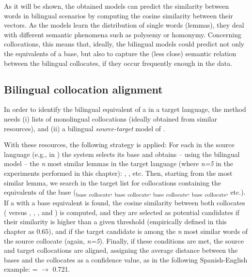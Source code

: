 \documentclass[output=paper,modfonts,nonflat]{langsci/langscibook}
\begin{document}
As it will be shown, the obtained models can predict the similarity between words
in bilingual scenarios by computing the cosine similarity between their vectors. As
the models learn the distribution of single words (lemmas), they deal with different
semantic phenomena such as polysemy or homonymy. Concerning collocations, this means
that, ideally, the bilingual models could predict not only the equivalents of a
base, but also to capture the (less close) semantic relation between the
bilingual collocates, if they occur frequently enough in the data.

%
\subsection{Bilingual collocation alignment}
\label{garcia:sec:align}
In order to identify the bilingual equivalent of a  in a target language,
the method needs (i) lists of monolingual collocations (ideally obtained from similar
resources), and (ii) a bilingual \emph{source-target} model of .

With these resources, the following strategy is applied: For each 
in the source language (e.g.,  in ) the system selects its base and obtains -- using the bilingual model --
the \emph{n} most similar lemmas in the target language (where \emph{n=5} in the experiments
performed in this chapter): , , etc. Then, starting from the most similar lemma,
we search in the target list for collocations containing the equivalents of
the base (\textsubscript{base} \textsubscript{collocate},
\textsubscript{base} \textsubscript{collocate}, \textsubscript{base} \textsubscript{collocate}, \textsubscript{base} \textsubscript{collocate}, etc.). If a  with
a base equivalent is found, the cosine similarity between both collocates
( versus , , , and ) is computed, and
they are selected as potential candidates if their similarity is higher than a given threshold
(empirically defined in this chapter as $0.65$), and if the target candidate is among the \emph{n}
most similar words of the source collocate (again, \emph{n=5}). Finally, if these conditions
are met, the source and target collocations are aligned, assigning the average distance between the
bases and the collocates as a confidence value, as in the following Spanish-English example:
 =  $\rightarrow$ 0.721.
\end{document}
